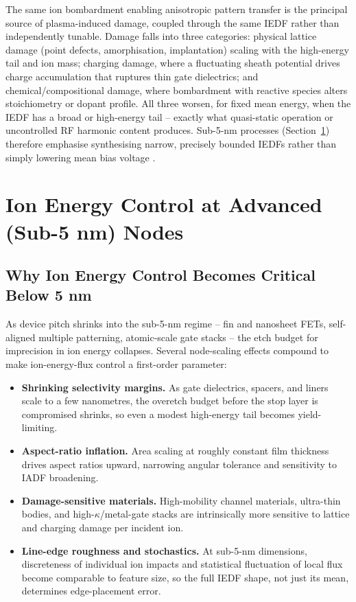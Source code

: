 The same ion bombardment enabling anisotropic pattern transfer is the principal source of plasma-induced damage, coupled through the same IEDF rather than independently tunable. Damage falls into three categories: physical lattice damage (point defects, amorphisation, implantation) scaling with the high-energy tail and ion mass; charging damage, where a fluctuating sheath potential drives charge accumulation that ruptures thin gate dielectrics; and chemical/compositional damage, where bombardment with reactive species alters stoichiometry or dopant profile. All three worsen, for fixed mean energy, when the IEDF has a broad or high-energy tail -- exactly what quasi-static operation or uncontrolled RF harmonic content produces. Sub-5-nm processes (Section~\ref{sec:etch_advanced}) therefore emphasise synthesising narrow, precisely bounded IEDFs rather than simply lowering mean bias voltage \cite{ref0539,ref0541}.

\section{Ion Energy Control at Advanced (Sub-5 nm) Nodes}
\label{sec:etch_advanced}

\subsection{Why Ion Energy Control Becomes Critical Below 5 nm}

As device pitch shrinks into the sub-5-nm regime -- fin and nanosheet FETs, self-aligned multiple patterning, atomic-scale gate stacks -- the etch budget for imprecision in ion energy collapses. Several node-scaling effects compound to make ion-energy-flux control a first-order parameter:

\begin{itemize}
\item \textbf{Shrinking selectivity margins.} As gate dielectrics, spacers, and liners scale to a few nanometres, the overetch budget before the stop layer is compromised shrinks, so even a modest high-energy tail becomes yield-limiting.
\item \textbf{Aspect-ratio inflation.} Area scaling at roughly constant film thickness drives aspect ratios upward, narrowing angular tolerance and sensitivity to IADF broadening.
\item \textbf{Damage-sensitive materials.} High-mobility channel materials, ultra-thin bodies, and high-$\kappa$/metal-gate stacks are intrinsically more sensitive to lattice and charging damage per incident ion.
\item \textbf{Line-edge roughness and stochastics.} At sub-5-nm dimensions, discreteness of individual ion impacts and statistical fluctuation of local flux become comparable to feature size, so the full IEDF shape, not just its mean, determines edge-placement error.
\end{itemize}

